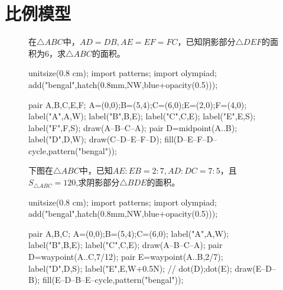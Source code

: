 \documentclass[12pt,space]{ctexart} %
\begin{document}
\section{比例模型}
\begin{figure}[ht]
	\begin{minipage}[b]{0.4\textwidth}
		在$\triangle ABC$中，$AD=DB,AE=EF=FC$，已知阴影部分$\triangle DEF$的面积为6，求$\triangle ABC$的面积。\\
		\begin{asy}
			unitsize(0.8 cm);
			import patterns;
			import olympiad;
			add("bengal",hatch(0.8mm,NW,blue+opacity(0.5)));

			pair A,B,C,E,F;
			A=(0,0);B=(5,4);C=(6,0);E=(2,0);F=(4,0);
			label("A",A,W);
			label("B",B,E);
			label("C",C,E);
			label("E",E,S);
			label("F",F,S);
			draw(A--B--C--A);
			pair D=midpoint(A..B);
			label("D",D,W);
			draw(C--D--E--F--D);
			fill(D--E--F--D--cycle,pattern("bengal"));
		\end{asy}
	\end{minipage}
	\qquad
	\begin{minipage}[b]{0.45\textwidth}
		下图在$\triangle ABC$中，已知$AE:EB=2:7,AD:DC=7:5$，且$S_{\triangle ABC}=120$,求阴影部分$\triangle BDE$的面积。\\
		\begin{asy}
			unitsize(0.8 cm);
			import patterns;
			import olympiad;
			add("bengal",hatch(0.8mm,NW,blue+opacity(0.5)));

			pair A,B,C;
			A=(0,0);B=(5,4);C=(6,0);
			label("A",A,W);
			label("B",B,E);
			label("C",C,E);
			draw(A--B--C--A);
			pair D=waypoint(A..C,7/12);
			pair E=waypoint(A..B,2/7);
			label("D",D,S);
			label("E",E,W+0.5N);
			// dot(D);dot(E);
			draw(E--D--B);
			fill(E--D--B--E--cycle,pattern("bengal"));

		\end{asy}
	\end{minipage}
\end{figure}
\vspace{1cm}
\end{document}
